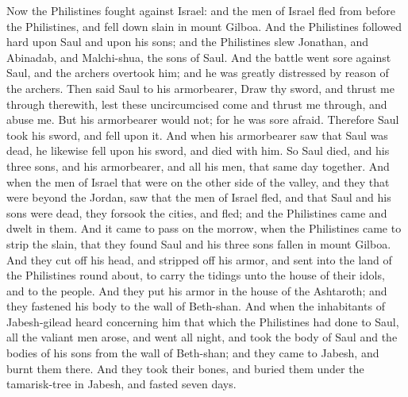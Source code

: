 Now the Philistines fought against Israel: and the men of Israel fled from before the Philistines, and fell down slain in mount Gilboa. And the Philistines followed hard upon Saul and upon his sons; and the Philistines slew Jonathan, and Abinadab, and Malchi-shua, the sons of Saul. And the battle went sore against Saul, and the archers overtook him; and he was greatly distressed by reason of the archers. Then said Saul to his armorbearer, Draw thy sword, and thrust me through therewith, lest these uncircumcised come and thrust me through, and abuse me. But his armorbearer would not; for he was sore afraid. Therefore Saul took his sword, and fell upon it. And when his armorbearer saw that Saul was dead, he likewise fell upon his sword, and died with him. So Saul died, and his three sons, and his armorbearer, and all his men, that same day together.  And when the men of Israel that were on the other side of the valley, and they that were beyond the Jordan, saw that the men of Israel fled, and that Saul and his sons were dead, they forsook the cities, and fled; and the Philistines came and dwelt in them. And it came to pass on the morrow, when the Philistines came to strip the slain, that they found Saul and his three sons fallen in mount Gilboa. And they cut off his head, and stripped off his armor, and sent into the land of the Philistines round about, to carry the tidings unto the house of their idols, and to the people. And they put his armor in the house of the Ashtaroth; and they fastened his body to the wall of Beth-shan. And when the inhabitants of Jabesh-gilead heard concerning him that which the Philistines had done to Saul, all the valiant men arose, and went all night, and took the body of Saul and the bodies of his sons from the wall of Beth-shan; and they came to Jabesh, and burnt them there. And they took their bones, and buried them under the tamarisk-tree in Jabesh, and fasted seven days. 
